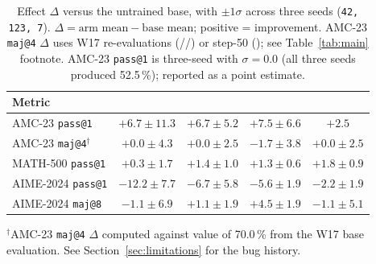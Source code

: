 \begin{table}[t]
\centering\small
\caption{Effect $\Delta$ versus the untrained base, with $\pm 1\sigma$ across
three seeds (\texttt{42, 123, 7}).
$\Delta = \text{arm mean} - \text{base mean}$; positive = improvement.
AMC-23 \texttt{maj@4} $\Delta$ uses W17 re-evaluations
(\armA{}/\armB{}/\armC{}) or step-50 (\armD{}); see
Table~\ref{tab:main} footnote. \armD{} AMC-23 \texttt{pass@1} is
three-seed with $\sigma=0.0$ (all three seeds produced 52.5\,\%);
reported as a point estimate.}
\label{tab:delta}
\begin{tabular}{lcccc}
\toprule
Metric & \armA{} & \armB{} & \armC{} & \armD{} \\
\midrule
AMC-23 \texttt{pass@1}      & $+6.7\pm 11.3$ & $+6.7\pm 5.2$ & $+7.5\pm 6.6$ & $+2.5$ \\
AMC-23 \texttt{maj@4}$^\dagger$ & $+0.0\pm 4.3$ & $+0.0\pm 2.5$ & $-1.7\pm 3.8$ & $+0.0\pm 2.5$ \\
MATH-500 \texttt{pass@1}    & $+0.3\pm 1.7$  & $+1.4\pm 1.0$ & $+1.3\pm 0.6$ & $+1.8\pm 0.9$ \\
AIME-2024 \texttt{pass@1}   & $-12.2\pm 7.7$ & $-6.7\pm 5.8$ & $-5.6\pm 1.9$ & $-2.2\pm 1.9$ \\
AIME-2024 \texttt{maj@8}    & $-1.1\pm 6.9$  & $+1.1\pm 1.9$ & $+4.5\pm 1.9$ & $-1.1\pm 5.1$ \\
\bottomrule
\end{tabular}

\medskip
\noindent\small
$^\dagger$AMC-23 \texttt{maj@4} $\Delta$ computed against \base{} value
of 70.0\,\% from the W17 base evaluation. See
Section~\ref{sec:limitations} for the bug history.
\end{table}
